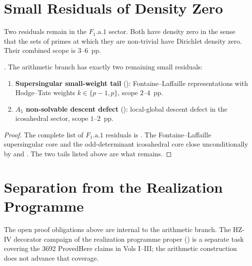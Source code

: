 \section{Small Residuals of Density Zero}
\label{v4-arith:w10-final:tier3}

Two residuals remain in the \(F_{1}\text{.a.1}\) sector. Both have
density zero in the sense that the sets of primes at which they are
non-trivial have Dirichlet density zero. Their combined scope is
\(3\)--\(6\)~pp.

\begin{proposition}
\label{v4-arith:w10-final:prop:small-residuals}
\ClaimStatusProvedHere. The arithmetic branch has exactly two
remaining small residuals:
\begin{enumerate}
\item \textbf{Supersingular small-weight tail}
(): Fontaine--Laffaille
representations with Hodge--Tate weights
\(k \in \{p-1, p\}\), scope \(2\)--\(4\)~pp.
\item \textbf{\(A_{5}\) non-solvable descent defect}
(): local-global descent defect
in the icosahedral sector, scope \(1\)--\(2\)~pp.
\end{enumerate}
\end{proposition}

\begin{proof}
The complete list of \(F_{1}\text{.a.1}\) residuals is
. The Fontaine--Laffaille
supersingular core and the odd-determinant icosahedral core close
unconditionally by  and
. The two tails listed
above are what remains.
\end{proof}

\section{Separation from the Realization Programme}
\label{v4-arith:w10-final:tier4}

The open proof obligations above are internal to the arithmetic branch.
The HZ-IV decorator campaign of the realization programme proper
() is a separate task covering the
3692 ProvedHere claims in Vols I--III; the arithmetic construction
does not advance that coverage.

